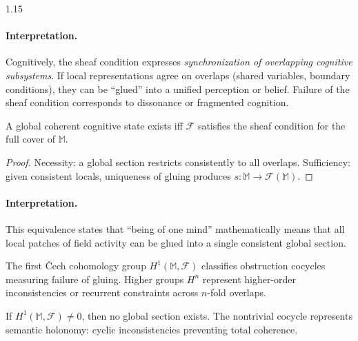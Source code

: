 \documentclass[12pt,a4paper]{article}
\begin{document}
\begin{spacing}{1.15}

\paragraph{Interpretation.}
Cognitively, the sheaf condition expresses
\emph{synchronization of overlapping cognitive subsystems}.
If local representations agree on overlaps (shared variables, boundary conditions),
they can be “glued” into a unified perception or belief.
Failure of the sheaf condition corresponds to
dissonance or fragmented cognition.

\begin{proposition}
\label{prop:global-sec}
A global coherent cognitive state exists
iff \(\mathscr{F}\) satisfies the sheaf condition for the full cover of \(\mathbb{M}\).
\end{proposition}

\begin{proof}
Necessity: a global section restricts consistently to all overlaps.
Sufficiency: given consistent locals, uniqueness of gluing produces
\(s:\mathbb{M}\to\mathscr{F}(\mathbb{M})\).
\end{proof}

\paragraph{Interpretation.}
This equivalence states that
“being of one mind” mathematically means that
all local patches of field activity
can be glued into a single consistent global section.

\begin{definition}
\label{def:cohomology}
The first Čech cohomology group
\(H^1(\mathbb{M},\mathscr{F})\)
classifies obstruction cocycles
measuring failure of gluing.
Higher groups \(H^n\) represent higher-order inconsistencies
or recurrent constraints across \(n\)-fold overlaps.
\end{definition}

\begin{proposition}
\label{prop:obstruction}
If \(H^1(\mathbb{M},\mathscr{F}) \neq 0\),
then no global section exists.
The nontrivial cocycle represents semantic holonomy:
cyclic inconsistencies preventing total coherence.
\end{proposition}


\end{spacing}
\end{document}
